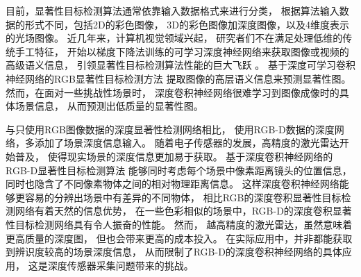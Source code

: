 



目前，显著性目标检测算法通常依靠输入数据格式来进行分类，
根据算法输入数据的形式不同，包括2D的彩色图像，
3D的彩色图像加深度图像，以及4维度表示的光场图像。
近几年来，计算机视觉领域兴起，
研究者们不在满足处理低维的传统手工特征，
开始以梯度下降法训练的可学习深度神经网络来获取图像或视频的高级语义信息，
引领显著性目标检测算法性能的巨大飞跃
。
基于深度可学习卷积神经网络的RGB显著性目标检测方法
提取图像的高层语义信息来预测显著性图。
然而，在面对一些挑战性场景时，
深度卷积神经网络很难学习到图像成像时的具体场景信息，
从而预测出低质量的显著性图。



与只使用RGB图像数据的深度显著性检测网络相比，
使用RGB-D数据的深度网络，多添加了场景深度信息输入。
随着电子传感器的发展，高精度的激光雷达开始普及，
使得现实场景的深度信息更加易于获取。
基于深度卷积神经网络的RGB-D显著性目标检测算法
能够同时考虑每个场景中像素距离镜头的位置信息，同时也隐含了不同像素物体之间的相对物理距离信息。
这样深度卷积神经网络能够更容易的分辨出场景中有差异的不同物体，
相比RGB的深度卷积显著性目标检测网络有着天然的信息优势，
在一些色彩相似的场景中，RGB-D的深度卷积显著性目标检测网络具有令人振奋的性能。
然而，
越高精度的激光雷达，虽然意味着更高质量的深度图，
但也会带来更高的成本投入。
在实际应用中，并非都能获取到辨识度较高的场景深度信息，
从而限制了RGB-D的深度卷积神经网络的具体应用，
这是深度传感器采集问题带来的挑战。





